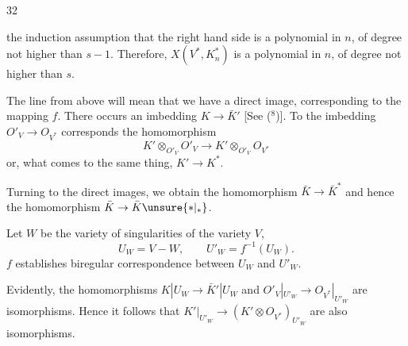 \begin{flushright}32\end{flushright}

the induction assumption that the right hand side is a polynomial in $n$, of degree not higher than $s-1$. Therefore, $X(V^*,K_n^*)$ is a polynomial in $n$, of degree not higher than $s$.

The line from above will mean that we have a direct image, corresponding to the mapping $f$. There occurs an imbedding $K\to\bar K'$ [See (${}^8$)]. To the imbedding $O'_V\to O_{V^*}$ corresponds the homomorphism
\[
 K'\otimes_{O'_V}O'_V\longrightarrow K'\otimes_{O'_V}O_{V^*}
\]
or, what comes to the same thing, $K'\to K^*$.

Turning to the direct images, we obtain the homomorphism $\bar K\to\bar K^*$ and hence the homomorphism $\bar K\to\bar K\unsure{*|{}_*}$.

Let $W$ be the variety of singularities of the variety $V$,
\[
 U_W=V-W,\qquad U'_W=f^{-1}(U_W).
\]
$f$ establishes biregular correspondence between $U_W$ and $U'_W$.

Evidently, the homomorphisms $K|U_W\to\bar K'|U_W$ and $O'_V|_{U'_W}\to O_{V^*}|_{U'_W}$ are isomorphisms. Hence it follows that $K'|_{U'_W}\to(K'\otimes O_{V^*})_{U'_W}$ are also isomorphisms.
